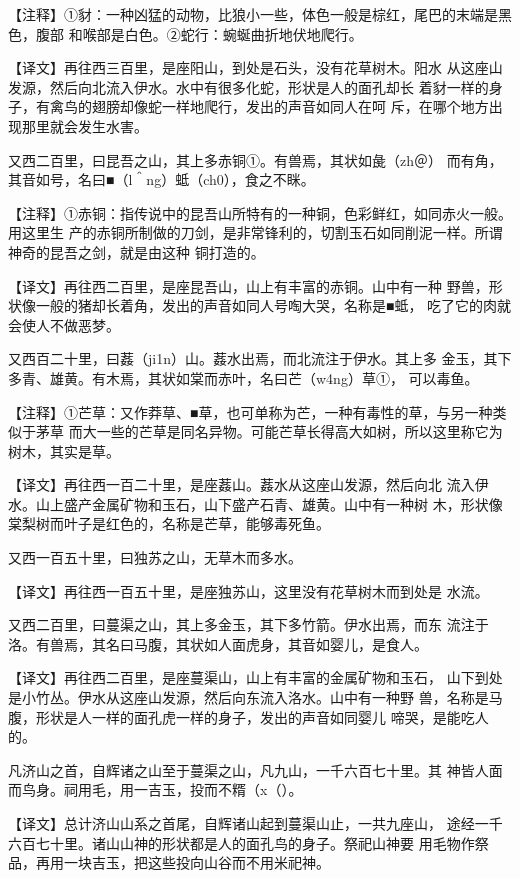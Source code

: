 \documentclass[a4paper,12pt,UTF8,twoside]{ctexbook}
\begin{document}
【注释】①豺：一种凶猛的动物，比狼小一些，体色一般是棕红，尾巴的末端是黑色，腹部 和喉部是白色。②蛇行：蜿蜒曲折地伏地爬行。

【译文】再往西三百里，是座阳山，到处是石头，没有花草树木。阳水 从这座山发源，然后向北流入伊水。水中有很多化蛇，形状是人的面孔却长 着豺一样的身子，有禽鸟的翅膀却像蛇一样地爬行，发出的声音如同人在呵 斥，在哪个地方出现那里就会发生水害。

又西二百里，曰昆吾之山，其上多赤铜①。有兽焉，其状如彘（zh＠） 而有角，其音如号，名曰■（l＾ng）蚳（ch0），食之不眯。

【注释】①赤铜：指传说中的昆吾山所特有的一种铜，色彩鲜红，如同赤火一般。用这里生 产的赤铜所制做的刀剑，是非常锋利的，切割玉石如同削泥一样。所谓神奇的昆吾之剑，就是由这种 铜打造的。

【译文】再往西二百里，是座昆吾山，山上有丰富的赤铜。山中有一种 野兽，形状像一般的猪却长着角，发出的声音如同人号啕大哭，名称是■蚳， 吃了它的肉就会使人不做恶梦。

又西百二十里，曰葌（ji1n）山。葌水出焉，而北流注于伊水。其上多 金玉，其下多青、雄黄。有木焉，其状如棠而赤叶，名曰芒（w4ng）草①， 可以毒鱼。

【注释】①芒草：又作莽草、■草，也可单称为芒，一种有毒性的草，与另一种类似于茅草 而大一些的芒草是同名异物。可能芒草长得高大如树，所以这里称它为树木，其实是草。

【译文】再往西一百二十里，是座葌山。葌水从这座山发源，然后向北 流入伊水。山上盛产金属矿物和玉石，山下盛产石青、雄黄。山中有一种树 木，形状像棠梨树而叶子是红色的，名称是芒草，能够毒死鱼。

又西一百五十里，曰独苏之山，无草木而多水。

【译文】再往西一百五十里，是座独苏山，这里没有花草树木而到处是 水流。

又西二百里，曰蔓渠之山，其上多金玉，其下多竹箭。伊水出焉，而东 流注于洛。有兽焉，其名曰马腹，其状如人面虎身，其音如婴儿，是食人。

【译文】再往西二百里，是座蔓渠山，山上有丰富的金属矿物和玉石， 山下到处是小竹丛。伊水从这座山发源，然后向东流入洛水。山中有一种野 兽，名称是马腹，形状是人一样的面孔虎一样的身子，发出的声音如同婴儿 啼哭，是能吃人的。

凡济山之首，自辉诸之山至于蔓渠之山，凡九山，一千六百七十里。其 神皆人面而鸟身。祠用毛，用一吉玉，投而不糈（x（）。

【译文】总计济山山系之首尾，自辉诸山起到蔓渠山止，一共九座山， 途经一千六百七十里。诸山山神的形状都是人的面孔鸟的身子。祭祀山神要 用毛物作祭品，再用一块吉玉，把这些投向山谷而不用米祀神。
\end{document}
